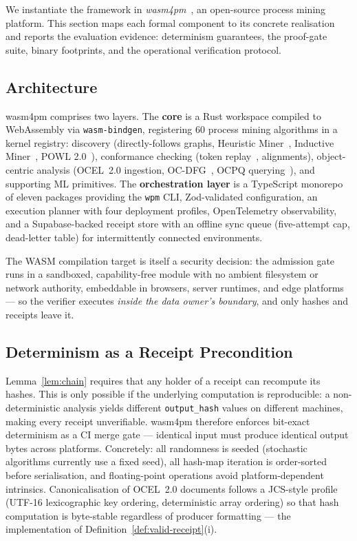 We instantiate the framework in \emph{wasm4pm}~\cite{chatman_wasm4pm_2026}, an
open-source process mining platform. This section maps each formal component to
its concrete realisation and reports the evaluation evidence: determinism
guarantees, the proof-gate suite, binary footprints, and the operational
verification protocol.

\subsection{Architecture}

wasm4pm comprises two layers. The \textbf{core} is a Rust workspace compiled to
WebAssembly via \texttt{wasm-bindgen}, registering 60 process mining algorithms
in a kernel registry: discovery (directly-follows graphs, Heuristic
Miner~\cite{weijters_et_al_heuristics_miner_2006}, Inductive
Miner~\cite{leemans_fahland_van_der_aalst_2013_constructive}, POWL
2.0~\cite{kourani_van_der_aalst_powl2_2024}), conformance checking (token
replay~\cite{rozinat_van_der_aalst_2008}, alignments), object-centric analysis
(OCEL~2.0 ingestion, OC-DFG~\cite{berti_van_der_aalst_oc_dfg_2023}, OCPQ
querying~\cite{kuesters_van_der_aalst_ocpq_2025}), and supporting ML primitives.
The \textbf{orchestration layer} is a TypeScript monorepo of eleven packages
providing the \texttt{wpm} CLI, Zod-validated configuration, an execution
planner with four deployment profiles, OpenTelemetry observability, and a
Supabase-backed receipt store with an offline sync queue (five-attempt cap,
dead-letter table) for intermittently connected environments.

The WASM compilation target is itself a security decision: the admission gate
runs in a sandboxed, capability-free module with no ambient filesystem or
network authority, embeddable in browsers, server runtimes, and edge platforms
--- so the verifier executes \emph{inside the data owner's boundary}, and only
hashes and receipts leave it.

\subsection{Determinism as a Receipt Precondition}
\label{sec:impl-determinism}

Lemma~\ref{lem:chain} requires that any holder of a receipt can recompute its
hashes. This is only possible if the underlying computation is reproducible:
a non-deterministic analysis yields different \texttt{output\_hash} values on
different machines, making every receipt unverifiable. wasm4pm therefore
enforces bit-exact determinism as a CI merge gate --- identical input must
produce identical output bytes across platforms. Concretely: all randomness is
seeded (stochastic algorithms currently use a fixed seed), all hash-map
iteration is order-sorted before serialisation, and floating-point operations
avoid platform-dependent intrinsics. Canonicalisation of OCEL~2.0 documents
follows a JCS-style profile (UTF-16 lexicographic key ordering, deterministic
array ordering) so that hash computation is byte-stable regardless of producer
formatting --- the implementation of Definition~\ref{def:valid-receipt}(i).

